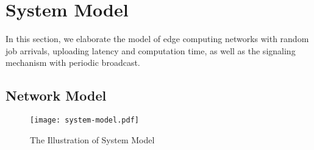 \section{System Model}
\label{sec:model}
In this section, we elaborate the model of edge computing networks with random job arrivals, uploading latency and computation time,
as well as the signaling mechanism with periodic broadcast.
\subsection{Network Model}
\begin{figure*}[htp!]
    \centering
    \texttt{[image: system-model.pdf]}
    \caption{The Illustration of System Model}
    \label{fig:system}
\end{figure*}


